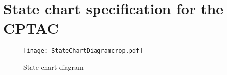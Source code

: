 \documentclass[Main_Assignment2]{subfiles}
\begin{document}
\section{State chart specification for the CPTAC}

\begin{figure}[H]
\centering
\texttt{[image: StateChartDiagramcrop.pdf]}
\caption{State chart diagram}
\label{fig:stateChart}
\end{figure}
\end{document}
